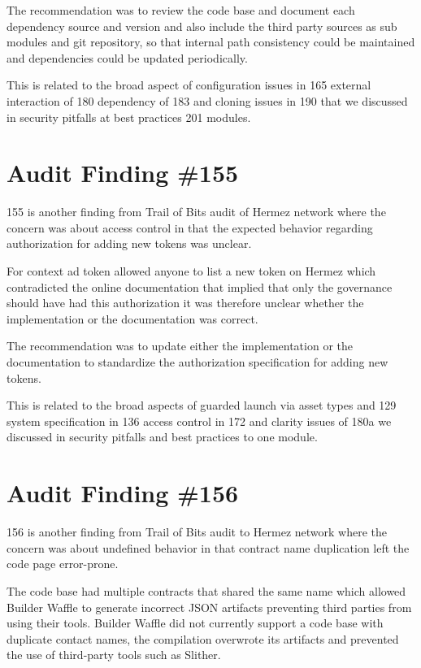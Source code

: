 The recommendation was to review the code base and document each dependency source and version and also include the third party sources as sub modules and git repository, so that internal path consistency could be maintained and dependencies could be updated periodically.

This is related to the broad aspect of configuration issues in 165 external interaction of 180 dependency of 183 and cloning issues in 190 that we discussed in security pitfalls at best practices 201 modules.

\section{Audit Finding \#155}

155 is another finding from Trail of Bits audit of Hermez network where the concern was about access control in that the expected behavior regarding authorization for adding new tokens was unclear. 

For context ad token allowed anyone to list a new token on Hermez which contradicted the online documentation that implied that only the governance should have had this authorization it was therefore unclear whether the implementation or the documentation was correct.

The recommendation was to update either the implementation or the documentation to standardize the authorization specification for adding new tokens.

This is related to the broad aspects of guarded launch via asset types and 129 system specification in 136 access control in 172 and clarity issues of 180a we discussed in security pitfalls and best practices to one module.

\section{Audit Finding \#156}

156 is another finding from Trail of Bits audit to Hermez network where the concern was about undefined behavior in that contract name duplication left the code page error-prone. 

The code base had multiple contracts that shared the same name which allowed Builder Waffle to generate incorrect JSON artifacts preventing third parties from using their tools. Builder Waffle did not currently support a code base with duplicate contact names, the compilation overwrote its artifacts and prevented the use of third-party tools such as Slither.

